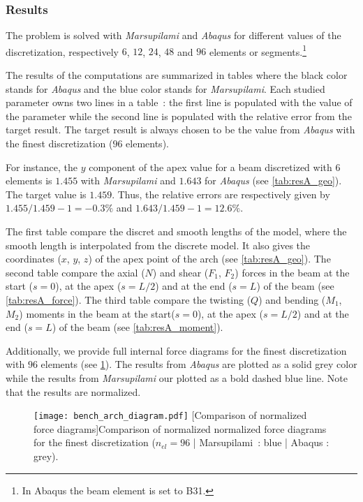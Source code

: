 \subsubsection{Results}

The problem is solved with \emph{Marsupilami} and \emph{Abaqus} for different values of the discretization, respectively $6$, $12$, $24$, $48$ and $96$ elements or segments.\footnote{In Abaqus the beam element is set to B31.}

The results of the computations are summarized in tables where the black color stands for \emph{Abaqus} and the blue color stands for \emph{Marsupilami}. Each studied parameter owns two lines in a table~: the first line is populated with the value of the parameter while the second line is populated with the relative error from the target result. The target result is always chosen to be the value from \emph{Abaqus} with the finest discretization ($96$ elements).

For instance, the $y$ component of the apex value for a beam discretized with $6$ elements is $1.455$ with \emph{Marsupilami} and $1.643$ for \emph{Abaqus} (see \cref{tab:resA_geo}). The target value is $1.459$. Thus, the relative errors are respectively given by $1.455/1.459 -1 = -0.3\%$ and $1.643/1.459 -1 = 12.6\%$.

The first table compare the discret and smooth lengths of the model, where the smooth length is interpolated from the discrete model. It also gives the coordinates ($x$, $y$, $z$) of the apex point of the arch (see \cref{tab:resA_geo}). The second table compare the axial ($N$) and shear ($F_1$, $F_2$) forces in the beam at the start ($s=0$), at the apex ($s=L/2$) and at the end ($s=L$) of the beam (see \cref{tab:resA_force}). The third table compare the twisting ($Q$) and bending ($M_1$, $M_2$) moments in the beam at the start($s=0$), at the apex ($s=L/2$) and at the end ($s=L$) of the beam (see \cref{tab:resA_moment}).

Additionally, we provide full internal force diagrams for the finest discretization with $96$ elements (see \cref{fig:bench_arch_diagram}). The results from \emph{Abaqus} are plotted as a solid grey color while the results from \emph{Marsupilami} our plotted as a bold dashed blue line. Note that the results are normalized.

\begin{figure}[p]
\begin{fullpage}
     	\centering
	\texttt{[image: bench\_arch\_diagram.pdf]}
	[Comparison of normalized force diagrams]{Comparison of normalized normalized force diagrams for the finest discretization ($n_{el}=96$ | Marsupilami~: blue | Abaqus : grey).}
	\label{fig:bench_arch_diagram} 
\end{fullpage}
\end{figure}


